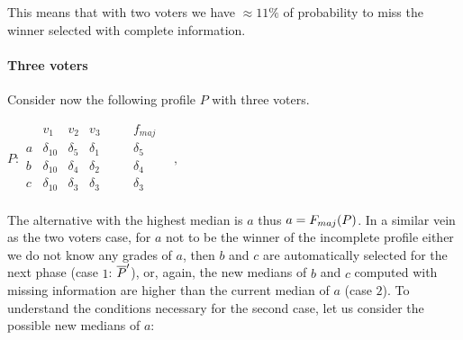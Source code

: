 \documentclass[version=3.21, pagesize, twoside=off, bibliography=totoc, DIV=calc, fontsize=12pt, a4paper]{scrartcl}
\begin{document}
This means that with two voters we have $\approx 11\%$ of probability to miss the winner selected with complete information.

\paragraph{Three voters}
Consider now the following profile $P$ with three voters.
\begin{center}
	$P:
	\begin{array}{cccccc}
		& v_1 & v_2 &v_3 & \quad & f_{maj} \\
		a &	\delta_{10} & \delta_5 & \delta_1 & \quad& \delta_5 \\
		b &	\delta_{10} & \delta_4 & \delta_2 &\quad& \delta_4 \\
		c &	\delta_{10} & \delta_3 & \delta_3 &\quad& \delta_3 \\
	\end{array} \quad, \qquad
	$
\end{center}
The alternative with the highest median is $a$ thus $a=F_{maj}(P)$. In a similar vein as the two voters case, for $a$ not to be the winner of the incomplete profile either we do not know any grades of $a$, then $b$ and $c$ are automatically selected for the next phase (case $1$: $\overline{P}'$), or, again, the new medians of $b$ and $c$ computed with missing information are higher than the current median of $a$ (case $2$). 
To understand the conditions necessary for the second case, let us consider the possible new medians of $a$:
\end{document}
